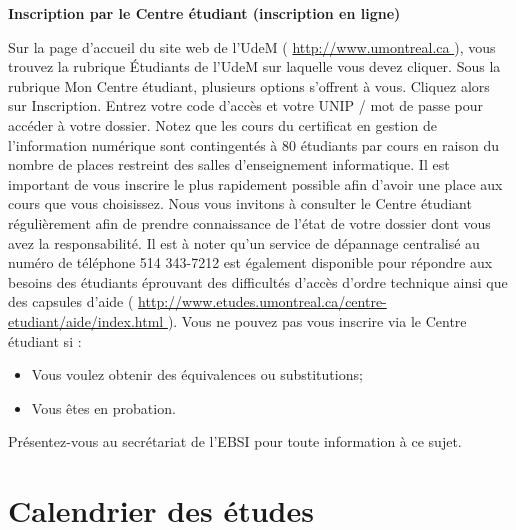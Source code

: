 \documentclass [12 pt]{article}
\begin{document}
        \textbf{
        Inscription par le Centre étudiant (inscription en ligne)
        }
    
            Sur la page d'accueil du site web de l'UdeM (
        \href{
        http://www.umontreal.ca/
        } {
        http://www.umontreal.ca
        }
    ), vous trouvez
                la rubrique Étudiants de l'UdeM sur laquelle vous devez cliquer.
                Sous la rubrique Mon Centre étudiant, plusieurs options s'offrent à
                vous. Cliquez alors sur Inscription. Entrez votre code d'accès et votre UNIP / mot
                de passe pour accéder à votre dossier.
            Notez que les cours du certificat en gestion de l'information
                numérique sont contingentés à 80 étudiants par cours en raison du
                nombre de places restreint des salles d'enseignement informatique. Il est important
                de vous inscrire le plus rapidement possible afin d'avoir une place aux cours que
                vous choisissez.
            Nous vous invitons à consulter le Centre étudiant régulièrement afin de prendre
                connaissance de l'état de votre dossier dont vous avez la responsabilité. Il est à
                noter qu'un service de dépannage centralisé au numéro de téléphone 514 343-7212 est
                également disponible pour répondre aux besoins des étudiants éprouvant des
                difficultés d'accès d'ordre technique ainsi que des capsules d'aide (
        \href{
        http://www.etudes.umontreal.ca/centre-etudiant/aide/index.html
        } {
        http://www.etudes.umontreal.ca/centre-etudiant/aide/index.html
        }
    ).
            Vous ne pouvez pas vous inscrire via le Centre étudiant si :
            
        \begin{itemize}
        
                
        \item Vous voulez obtenir des équivalences ou substitutions;
                
        \item Vous êtes en probation.
            
        \end{itemize}
    
            Présentez-vous au secrétariat de l'EBSI pour toute information à ce sujet.
        
    
    
        \newpage
        \section {
        Calendrier des études
        }
        
\end{document}
